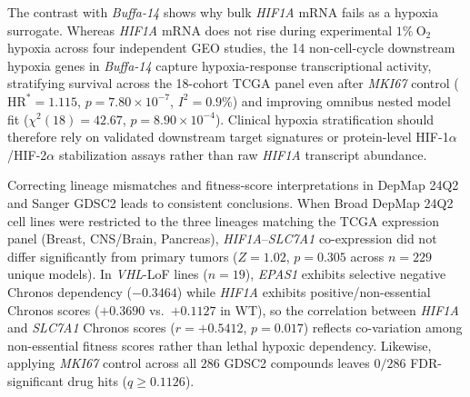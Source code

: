 \documentclass[11pt]{article}
\begin{document}
The contrast with \textit{Buffa-14} shows why bulk \textit{HIF1A} mRNA fails as a hypoxia surrogate. Whereas \textit{HIF1A} mRNA does not rise during experimental $1\%\ \text{O}_2$ hypoxia across four independent GEO studies, the 14 non-cell-cycle downstream hypoxia genes in \textit{Buffa-14} capture hypoxia-response transcriptional activity, stratifying survival across the 18-cohort TCGA panel even after \textit{MKI67} control ($\text{HR}^* = 1.115$, $p = 7.80 \times 10^{-7}$, $I^2 = 0.9\%$) and improving omnibus nested model fit ($\chi^2(18) = 42.67$, $p = 8.90 \times 10^{-4}$). Clinical hypoxia stratification should therefore rely on validated downstream target signatures or protein-level HIF-1$\alpha$/HIF-2$\alpha$ stabilization assays rather than raw \textit{HIF1A} transcript abundance.

Correcting lineage mismatches and fitness-score interpretations in DepMap 24Q2 and Sanger GDSC2 leads to consistent conclusions. When Broad DepMap 24Q2 cell lines were restricted to the three lineages matching the TCGA expression panel (Breast, CNS/Brain, Pancreas), \textit{HIF1A}--\textit{SLC7A1} co-expression did not differ significantly from primary tumors ($Z = 1.02$, $p = 0.305$ across $n = 229$ unique models). In \textit{VHL}-LoF lines ($n = 19$), \textit{EPAS1} exhibits selective negative Chronos dependency ($-0.3464$) while \textit{HIF1A} exhibits positive/non-essential Chronos scores ($+0.3690$ vs.\ $+0.1127$ in WT), so the correlation between \textit{HIF1A} and \textit{SLC7A1} Chronos scores ($r = +0.5412$, $p = 0.017$) reflects co-variation among non-essential fitness scores rather than lethal hypoxic dependency. Likewise, applying \textit{MKI67} control across all $286$ GDSC2 compounds leaves $0/286$ FDR-significant drug hits ($q \ge 0.1126$).
\end{document}
